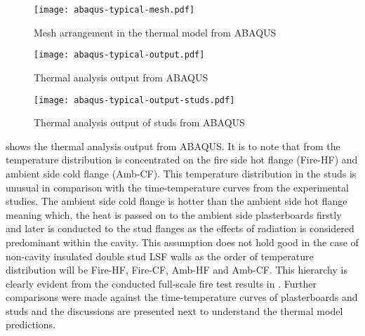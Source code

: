 \begin{figure}[!htbp]
	\centering
		\texttt{[image: abaqus-typical-mesh.pdf]}
		\caption{Mesh arrangement in the thermal model from ABAQUS}
		\label{fig:abaqus-typical-mesh}
\end{figure}
\begin{figure}[!htbp]
	\centering
		\texttt{[image: abaqus-typical-output.pdf]}
		\caption{Thermal analysis output from ABAQUS}
		\label{fig:abaqus-typical-output}
\end{figure}
\begin{figure}[!htbp]
	\centering
		\texttt{[image: abaqus-typical-output-studs.pdf]}
		\caption{Thermal analysis output of studs from ABAQUS}
		\label{fig:abaqus-typical-output-studs}
\end{figure}

 shows the thermal analysis output from ABAQUS. It is to note that from  the temperature distribution is concentrated on the fire side hot flange (Fire-HF) and ambient side cold flange (Amb-CF). This temperature distribution in the studs is unusual in comparison with the time-temperature curves from the experimental studies. The ambient side cold flange is hotter than the ambient side hot flange meaning which, the heat is passed on to the ambient side plasterboards firstly and later is conducted to the stud flanges as the effects of radiation is considered predominant within the cavity. This assumption does not hold good in the case of non-cavity insulated double stud LSF walls as the order of temperature distribution will be Fire-HF, Fire-CF, Amb-HF and Amb-CF. This hierarchy is clearly evident from the conducted full-scale fire test results in . Further comparisons were made against the time-temperature curves of plasterboards and studs and the discussions are presented next to understand the thermal model predictions.

